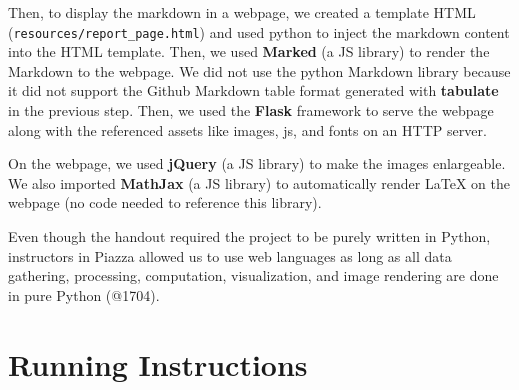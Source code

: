 \documentclass{article}
\begin{document}
    Then, to display the markdown in a webpage, we created a template HTML (\verb|resources/report_page.html|) and used python to inject the markdown content into the HTML template. Then, we used \textbf{Marked} (a JS library) to render the Markdown to the webpage. We did not use the python Markdown library because it did not support the Github Markdown table format generated with \textbf{tabulate} in the previous step. Then, we used the \textbf{Flask} framework to serve the webpage along with the referenced assets like images, js, and fonts on an HTTP server.

    On the webpage, we used \textbf{jQuery} (a JS library) to make the images enlargeable. We also imported \textbf{MathJax} (a JS library) to automatically render LaTeX on the webpage (no code needed to reference this library).

    Even though the handout required the project to be purely written in Python, instructors in Piazza allowed us to use web languages as long as all data gathering, processing, computation, visualization, and image rendering are done in pure Python (@1704).

    \section{Running Instructions}
    \indent
\end{document}

